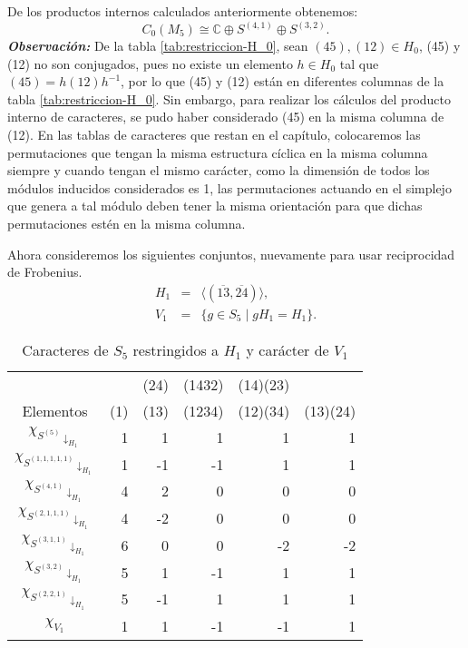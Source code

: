 \documentclass[12pt]{book}
\theoremstyle{definition}
\newcounter{in}
\begin{document}
De los productos internos calculados anteriormente obtenemos:
\begin{equation}
  \label{eq:C0-M5}
  C_{0}(M_{5})\cong \mathbb{C}\oplus S^{(4,1)} \oplus S^{(3,2)}. 
\end{equation}
\textbf{\emph{Observación:}} De la tabla \ref{tab:restriccion-H_0},
sean $(45),(12)\in H_{0}$, (45) y (12) no son conjugados, pues no existe un elemento
$h\in H_{0}$ tal que $(45)=h(12)h^{-1}$, por lo que (45) y (12) están
en diferentes columnas de la tabla \ref{tab:restriccion-H_0}. Sin
embargo, para realizar los cálculos del producto interno de caracteres,
se pudo haber considerado (45) en la misma columna de (12). En las
tablas de caracteres que restan en el capítulo, colocaremos las
permutaciones que tengan la misma estructura cíclica en la misma
columna siempre y cuando tengan el mismo carácter, como la dimensión
de todos los módulos inducidos considerados es 1, las permutaciones
actuando en el simplejo que genera a tal módulo deben tener la misma
orientación para que dichas permutaciones estén en la misma columna.

Ahora consideremos los siguientes conjuntos, nuevamente para usar
reciprocidad de Frobenius.
\begin{eqnarray*}
  H_{1}&=&\langle(\overline{13},\overline{24})\rangle,\\
  V_{1}&=&\{g\in S_{5}\mid gH_{1}=H_{1}\}.
\end{eqnarray*}

  \begin{table}[!hbtp]
    \centering
    \begin{small}
      \begin{tabular}{c |r r r r r}
        & & (24) & (1432) & (14)(23) & \\
        Elementos & (1) & (13) & (1234) & (12)(34) & (13)(24) \\
        \hline
        $\chi_{S^{(5)}\downarrow_{H_{1}}}$       & 1 & 1 & 1 & 1 & 1 \\
        $\chi_{S^{(1,1,1,1,1)}\downarrow_{H_{1}}}$ & 1 & -1 & -1 & 1 & 1 \\
        $\chi_{S^{(4,1)}\downarrow_{H_{1}}}$      & 4 & 2 & 0 & 0 & 0 \\
        $\chi_{S^{(2,1,1,1)}\downarrow_{H_{1}}}$   & 4 & -2 & 0 & 0 & 0 \\
        $\chi_{S^{(3,1,1)}\downarrow_{H_{1}}}$     & 6 & 0 & 0 & -2 & -2 \\
        $\chi_{S^{(3,2)}\downarrow_{H_{1}}}$      & 5 & 1 & -1 & 1 & 1 \\
        $\chi_{S^{(2,2,1)}\downarrow_{H_{1}}}$    & 5 & -1 & 1 & 1 & 1 \\
        \hline
        $\chi_{V_{1}}$ & 1 & 1 & -1 & -1 & 1 \\
      \end{tabular}

    \end{small}
    \caption{Caracteres de $S_5$ restringidos a $H_{1}$ y carácter de $V_{1}$}
    \label{tab:restriccion-H_1}
  \end{table}
\end{document}

